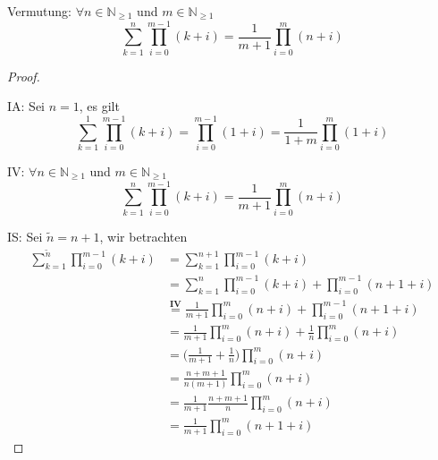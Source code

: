 Vermutung: $\forall n\in\mathbb{N}_{\geq1}$ und $m\in\mathbb{N}_{\geq 1}$
\begin{equation*}
\sum_{k=1}^{n}\prod_{i=0}^{m-1}(k+i)=\frac{1}{m+1}\prod_{i=0}^{m}(n+i)
\end{equation*}
\begin{proof}
$ $\newline

IA: Sei $n=1$, es gilt
\begin{equation*}
\sum_{k=1}^{1}\prod_{i=0}^{m-1}(k+i)=\prod_{i=0}^{m-1}(1+i)=\frac{1}{1+m}\prod_{i=0}^{m}(1+i)
\end{equation*}

IV: $\forall n\in\mathbb{N}_{\geq1}$ und $m\in\mathbb{N}_{\geq 1}$
\begin{equation*}
\sum_{k=1}^{n}\prod_{i=0}^{m-1}(k+i)=\frac{1}{m+1}\prod_{i=0}^{m}(n+i)
\end{equation*}

IS: Sei $\tilde{n}=n+1$, wir betrachten
\begin{align*}
\sum_{k=1}^{\tilde{n}}\prod_{i=0}^{m-1}(k+i)
&=
\sum_{k=1}^{n+1}\prod_{i=0}^{m-1}(k+i)\\
&=
\sum_{k=1}^{n}\prod_{i=0}^{m-1}(k+i)+
\prod_{i=0}^{m-1}(n+1+i)\\
&\overset{\mathbf{IV}}{=}
\frac{1}{m+1}\prod_{i=0}^{m}(n+i)+
\prod_{i=0}^{m-1}(n+1+i)\\
&=
\frac{1}{m+1}\prod_{i=0}^{m}(n+i)+
\frac{1}{n}\prod_{i=0}^{m}(n+i)\\
&=
\Big(\frac{1}{m+1}+\frac{1}{n}\Big)\prod_{i=0}^{m}(n+i)\\
&=
\frac{n+m+1}{n(m+1)}\prod_{i=0}^{m}(n+i)\\
&=
\frac{1}{m+1}\frac{n+m+1}{n}\prod_{i=0}^{m}(n+i)\\
&=
\frac{1}{m+1}\prod_{i=0}^{m}(n+1+i)
\end{align*}
\end{proof}

\newpage

